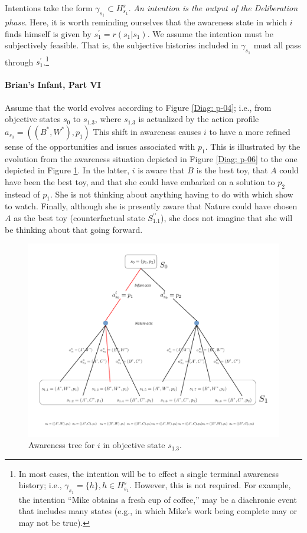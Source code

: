 \documentclass[
11pt,
titlepage,
reqno,
]{article}%
\theoremstyle{definition}
\begin{document}
Intentions take the form $\gamma_{s_1}\subset H^s_{s_1}$.
\textit{An intention is the output of the Deliberation phase}.
Here, it is worth reminding ourselves that the awareness state in which $i$ finds himself is given by $s^\prime_1=r(s_1|s_1)$.
We assume the intention must be subjectively feasible.
That is, the subjective histories included in $\gamma_{s_1}$ must all pass through $s^\prime_1$.\footnote
{
	In most cases, the intention will be to effect a single terminal awareness history; i.e., $\gamma_{s_1}=\{h\}, h\in H^s_{s_1}$. 
	However, this is not required. 
	For example, the intention ``Mike obtains a fresh cup of coffee,'' may be a diachronic event that includes many states (e.g., in which Mike's work being complete may or may not be true).
}
 

\paragraph{Brian's Infant, Part VI}
Assume that the world evolves according to Figure \ref{Diag: p-04}; i.e., from objective states $s_0$ to $s_{1.3}$, where $s_{1.3}$ is actualized by the action profile $a_{s_0}=((B^\ast,W^\ast),p_1)$
This shift in awareness causes $i$ to have a more refined sense of the opportunities and issues associated with $p_1$.
This is illustrated by the evolution from the awareness situation depicted in Figure \ref{Diag: p-06} to the one depicted in Figure \ref{Diag: p-07}. 
In the latter, $i$ is aware that $B$ is the best toy, that $A$ could have been the best toy, and that she could have embarked on a solution to $p_2$ instead of $p_1$. 
She is not thinking about anything having to do with which show to watch.
Finally, although she is presently aware that Nature could have chosen $A$ as the best toy (counterfactual state $S^{\prime\prime}_{1.1}$),
she does not imagine that she will be thinking about that going forward.

\begin{figure}[h!]
	\centering
	\includegraphics*[page=7,trim = 0in 0in 1in 0in,scale=.7]{Awareness_Diagrams_All}
	\caption{Awareness tree for $i$ in objective state $s_{1.3}$.\label{Diag: p-07}}%
\end{figure}
\end{document}
